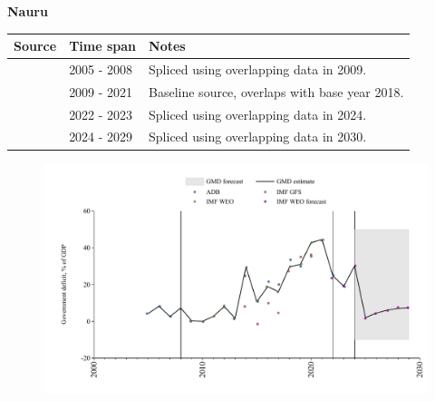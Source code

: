 \documentclass[12pt,a4paper,landscape]{article}
\begin{document}
\begin{adjustbox}{max totalsize={\paperwidth}{\paperheight},center}
\begin{minipage}[t][\textheight][t]{\textwidth}
\vspace*{0.5cm}
{}
\begin{center}
{\Large\bfseries Nauru}
\end{center}
\vspace{0.5cm}
\begin{table}[H]
\centering
\small
\begin{tabular}{|l|l|l|}
\hline
\textbf{Source} & \textbf{Time span} & \textbf{Notes} \\
\hline
\rowcolor{white}\cite{ADB}& 2005 - 2008 &Spliced using overlapping data in 2009.\\
\rowcolor{lightgray}\cite{IMF_WEO}& 2009 - 2021 &Baseline source, overlaps with base year 2018.\\
\rowcolor{white}\cite{ADB}& 2022 - 2023 &Spliced using overlapping data in 2024.\\
\rowcolor{lightgray}\cite{IMF_WEO_forecast}& 2024 - 2029 &Spliced using overlapping data in 2030.\\
\hline
\end{tabular}
\end{table}
\begin{figure}[H]
\centering
\includegraphics[width=\textwidth,height=0.6\textheight,keepaspectratio]{graphs/NRU_govdef_GDP.pdf}
\end{figure}
\end{minipage}
\end{adjustbox}
\end{document}
